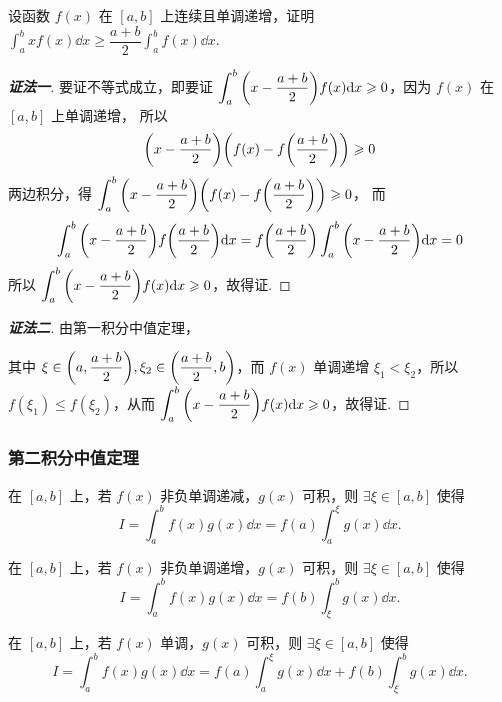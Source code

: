 \begin{example}
    设函数 $f(x)$ 在 $[a,b]$ 上连续且单调递增，证明 $\displaystyle\int_{a}^{b}xf(x)\dd x\geqslant \dfrac{a+b}{2}\int_{a}^{b}f(x)\dd x.$
    \label{intabxfxdx}
\end{example}
\begin{proof}[{\songti \textbf{证法一}}]
    要证不等式成立，即要证 $\displaystyle\int_{a}^{b}\qty(x-\dfrac{a+b}{2})f(x)\dd x\geqslant 0$，因为 $f(x)$ 在 $[a,b]$ 上单调递增，
    所以
    $$\displaystyle \qty(x-\dfrac{a+b}{2})\qty(f(x)-f\qty(\dfrac{a+b}{2}))\geqslant 0$$
    两边积分，得
    $\displaystyle \int_{a}^{b}\qty(x-\dfrac{a+b}{2})\qty(f(x)-f\qty(\dfrac{a+b}{2}))\geqslant 0$，
    而 $$\displaystyle\int_{a}^{b}\qty(x-\dfrac{a+b}{2})f\qty(\dfrac{a+b}{2})\dd x=f\qty(\dfrac{a+b}{2})\int_{a}^{b}\qty(x-\dfrac{a+b}{2})\dd x=0$$
    所以 $\displaystyle\int_{a}^{b}\qty(x-\dfrac{a+b}{2})f(x)\dd x\geqslant 0$，故得证.
\end{proof}
\begin{proof}[{\songti \textbf{证法二}}]
    由第一积分中值定理，
    其中 $\xi\in\qty(a,\dfrac{a+b}{2}),\xi_2\in\qty(\dfrac{a+b}{2},b)$，而 $f(x)$ 单调递增 $\xi_1<\xi_2$，所以 $f(\xi_1)\leqslant f(\xi_2)$，从而 $\displaystyle \int_{a}^{b}\qty(x-\dfrac{a+b}{2})f(x)\dd x\geqslant 0$，故得证.
\end{proof}

\subsubsection{第二积分中值定理}

\begin{theorem}[第二积分中值定理 A]
    在 $ [a, b] $ 上，若 $ f(x) $ 非负单调递减，$g(x) $ 可积，则 $ \exists \xi \in[a, b] $ 使得
    $$I=\int_{a}^{b} f(x) g(x) \dd  x=f(a) \int_{a}^{\xi} g(x) \dd  x.$$
\end{theorem}
\begin{theorem}[第二积分中值定理 B]
    在 $ [a, b] $ 上，若 $ f(x) $ 非负单调递增，$g(x) $ 可积，则 $ \exists \xi \in[a, b] $ 使得
    $$I=\int_{a}^{b} f(x) g(x) \dd  x=f(b) \int_{\xi}^{b} g(x) \dd  x.$$
\end{theorem}
\begin{theorem}[第二积分中值定理 C]
    在 $ [a, b] $ 上，若 $ f(x) $ 单调，$g(x) $ 可积，则 $ \exists \xi \in[a, b] $ 使得
    $$I=\int_{a}^{b} f(x) g(x) \dd  x=f(a) \int_{a}^{\xi} g(x) \dd  x+f(b) \int_{\xi}^{b} g(x) \dd  x .$$
\end{theorem}

